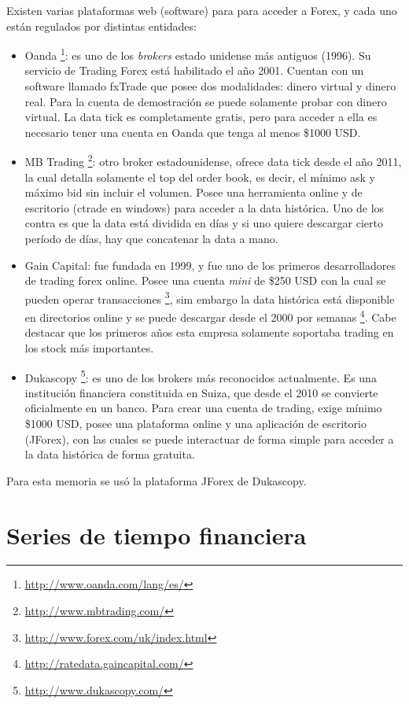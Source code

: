 Existen varias plataformas web (software) para para acceder a Forex, y cada uno
están regulados por distintas entidades:
\begin{itemize}
 \item Oanda \footnote{\url{http://www.oanda.com/lang/es/}}: es uno de los
\emph{brokers} estado unidense más antiguos (1996).  Su servicio de Trading
Forex está habilitado el año 2001. Cuentan con un software llamado fxTrade que
posee dos modalidades: dinero virtual y dinero real. Para la cuenta de
demostración se puede solamente probar con dinero virtual. La data tick es
completamente gratis, pero para acceder a ella es necesario tener una cuenta en
Oanda que tenga al menos \$1000 USD.
 \item MB Trading \footnote{\url{http://www.mbtrading.com/}}: otro broker
estadounidense, ofrece data tick desde el año 2011, la cual detalla solamente
el top del order book, es decir, el mínimo ask y máximo bid sin incluir el
volumen. Posee una herramienta online y de escritorio (ctrade en windows) para
acceder a la data histórica. Uno de los contra es que la data está dividida en
días y si uno quiere descargar cierto período de días, hay que concatenar la
data a mano.
 \item Gain Capital: fue fundada en 1999, y fue uno de los primeros
desarrolladores de trading forex online. Posee una cuenta \emph{mini} de \$250
USD con la cual se pueden operar transacciones
\footnote{\url{http://www.forex.com/uk/index.html}}, sim embargo la data histórica
está disponible en directorios online y se puede descargar desde el 2000 por
semanas \footnote{\url{http://ratedata.gaincapital.com/}}. Cabe destacar que los primeros
años esta empresa solamente soportaba trading en los stock más importantes.
 \item Dukascopy \footnote{\url{http://www.dukascopy.com/}}: es uno de los brokers
más reconocidos actualmente. Es una institución financiera constituida en
Suiza, que desde el 2010 se convierte oficialmente en un banco. Para crear una
cuenta de trading, exige mínimo \$1000 USD, posee una plataforma online y una
aplicación de escritorio (JForex), con las cuales se puede interactuar de forma
simple para acceder a la data histórica de forma gratuita.
\end{itemize}

Para esta memoria se usó la plataforma JForex de Dukascopy.

\section{Series de tiempo financiera}

